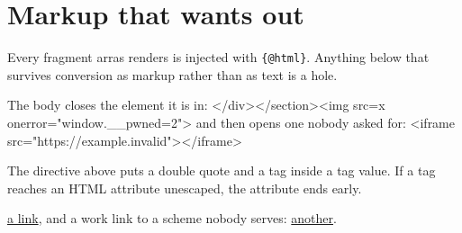 \section{Markup that wants out}\label{hx-0100}

Every fragment arras renders is injected with \verb|{@html}|. Anything below that survives conversion as markup rather than as text is a hole.

\begin{theorem}[A title that closes its own tag: </h1><script>window.__pwned=1</script>]\label{hx-0001}
The body closes the element it is in: </div></section><img src=x onerror="window.__pwned=2">
and then opens one nobody asked for: <iframe src="https://example.invalid"></iframe>
\end{theorem}

\begin{lemma}\label{hx-0002}
The directive above puts a double quote and a tag inside a tag value. If a tag reaches an HTML attribute unescaped, the attribute ends early.
\end{lemma}

\begin{definition}\label{hx-0003}
\href{javascript:window.__pwned=3}{a link}, and a work link to a scheme nobody serves: \href{loom:javascript:alert(1)}{another}.
\end{definition}
